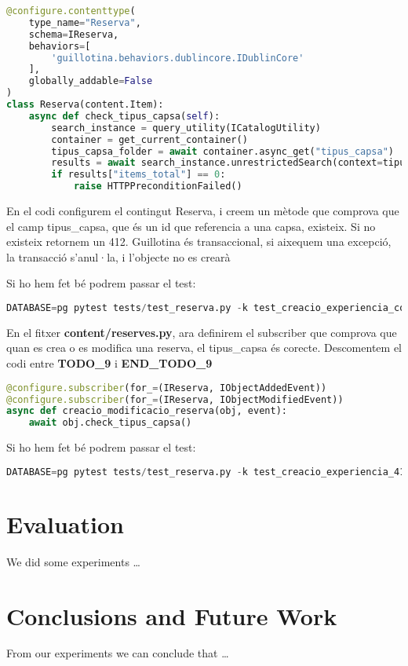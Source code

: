 \documentclass[a4paper, 11pt]{article}
\begin{document}
\begin{lstlisting}[language=Python, caption=Definició content type Reserva]
@configure.contenttype(
    type_name="Reserva",
    schema=IReserva,
    behaviors=[
        'guillotina.behaviors.dublincore.IDublinCore'
    ],
    globally_addable=False
)
class Reserva(content.Item):
    async def check_tipus_capsa(self):
        search_instance = query_utility(ICatalogUtility)
        container = get_current_container()
        tipus_capsa_folder = await container.async_get("tipus_capsa")
        results = await search_instance.unrestrictedSearch(context=tipus_capsa_folder, query={"id": self.tipus_capsa})
        if results["items_total"] == 0:
            raise HTTPPreconditionFailed()
\end{lstlisting}
En el codi configurem el contingut Reserva, i creem un mètode que
comprova que el camp tipus\_capsa, que és un id que referencia a una
capsa, existeix. Si no existeix retornem un 412. Guillotina és
transaccional, si aixequem una excepció, la transacció s'anul·la, i
l'objecte no es crearà

Si ho hem fet bé podrem passar el test:
\begin{lstlisting}[language=Python, caption=Testing 5]
  DATABASE=pg pytest tests/test_reserva.py -k test_creacio_experiencia_correcte
\end{lstlisting}

En el fitxer \textbf{content/reserves.py}, ara definirem el subscriber
que comprova que quan es crea o es modifica una reserva, el
tipus\_capsa és corecte. Descomentem el codi entre \textbf{TODO\_9} i
\textbf{END\_TODO\_9}

\begin{lstlisting}[language=Python, caption=Definició subscriber Reserva]
@configure.subscriber(for_=(IReserva, IObjectAddedEvent))
@configure.subscriber(for_=(IReserva, IObjectModifiedEvent))
async def creacio_modificacio_reserva(obj, event):
    await obj.check_tipus_capsa()
  \end{lstlisting}

Si ho hem fet bé podrem passar el test:
\begin{lstlisting}[language=Python, caption=Testing 6]
  DATABASE=pg pytest tests/test_reserva.py -k test_creacio_experiencia_412
\end{lstlisting}

          

\pagebreak

\section{Evaluation}

We did some experiments \ldots

\pagebreak

\section{Conclusions and Future Work}

From our experiments we can conclude that \ldots


\end{document}
